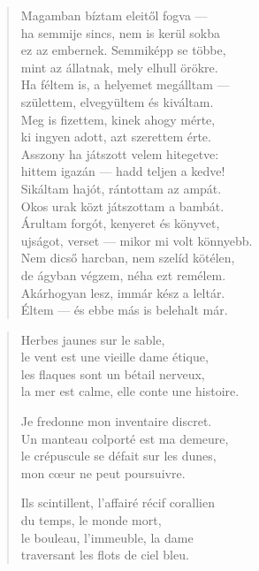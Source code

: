 \documentclass[11pt]{book}
\newcommand*{\centeredornament}{\centerline{\pgfornament[width=6cm]{88}}}
\begin{document}
\begin{verse}
  Magamban bíztam eleitől fogva --- \\
  ha semmije sincs, nem is kerül sokba \\
  ez az embernek. Semmiképp se többe, \\
  mint az állatnak, mely elhull örökre. \\
  Ha féltem is, a helyemet megálltam --- \\
  születtem, elvegyültem és kiváltam. \\
  Meg is fizettem, kinek ahogy mérte, \\
  ki ingyen adott, azt szerettem érte. \\
  Asszony ha játszott velem hitegetve: \\
  hittem igazán --- hadd teljen a kedve! \\
  Sikáltam hajót, rántottam az ampát. \\
  Okos urak közt játszottam a bambát. \\
  Árultam forgót, kenyeret és könyvet, \\
  ujságot, verset --- mikor mi volt könnyebb. \\
  Nem dicső harcban, nem szelíd kötélen, \\
  de ágyban végzem, néha ezt remélem. \\
  Akárhogyan lesz, immár kész a leltár. \\
  Éltem --- és ebbe más is belehalt már.
\end{verse}

\newpage

\vspace*{-15mm}
\centeredornament



\begin{verse}
  Herbes jaunes sur le sable, \\
  le vent est une vieille dame étique, \\
  les flaques sont un bétail nerveux, \\
  la mer est calme, elle conte une histoire.

  Je fredonne mon inventaire discret. \\
  Un manteau colporté est ma demeure, \\
  le crépuscule se défait sur les dunes, \\
  mon cœur ne peut poursuivre.

  Ils scintillent, l'affairé récif corallien \\
  du temps, le monde mort, \\
  le bouleau, l'immeuble, la dame \\
  traversant les flots de ciel bleu.
\end{verse}
\end{document}
